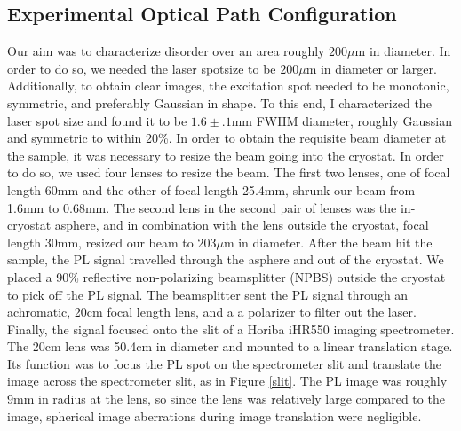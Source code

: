 \subsection{Experimental Optical Path Configuration}
\indent Our aim was to characterize disorder over an area roughly $200\mu$m in diameter. In order to do so, we needed the laser spotsize to be $200\mu$m in diameter or larger. Additionally, to obtain clear images, the excitation spot needed to be monotonic, symmetric, and preferably Gaussian in shape. To this end, I characterized the laser spot size and found it to be $1.6\pm.1$mm FWHM diameter, roughly Gaussian and symmetric to within 20\%. In order to obtain the requisite beam diameter at the sample, it was necessary to resize the beam going into the cryostat. In order to do so, we used four lenses to resize the beam. The first two lenses, one of focal length 60mm and the other of focal length 25.4mm, shrunk our beam from 1.6mm to 0.68mm. The second lens in the second pair of lenses was the in-cryostat asphere, and in combination with the lens outside the cryostat, focal length 30mm, resized our beam to $203\mu$m in diameter. After the beam hit the sample, the PL signal travelled through the asphere and out of the cryostat. We placed a 90\% reflective non-polarizing beamsplitter (NPBS) outside the cryostat to pick off the PL signal. The beamsplitter sent the PL signal through an achromatic, 20cm focal length lens, and a a polarizer to filter out the laser. Finally, the signal focused onto the slit of a Horiba iHR550 imaging spectrometer. The 20cm lens was 50.4cm in diameter and mounted to a linear translation stage. Its function was to focus the PL spot on the spectrometer slit and translate the image across the spectrometer slit, as in Figure \ref{slit}. The PL image was roughly 9mm in radius at the lens, so since the lens was relatively large compared to the image, spherical image aberrations during image translation were negligible.


